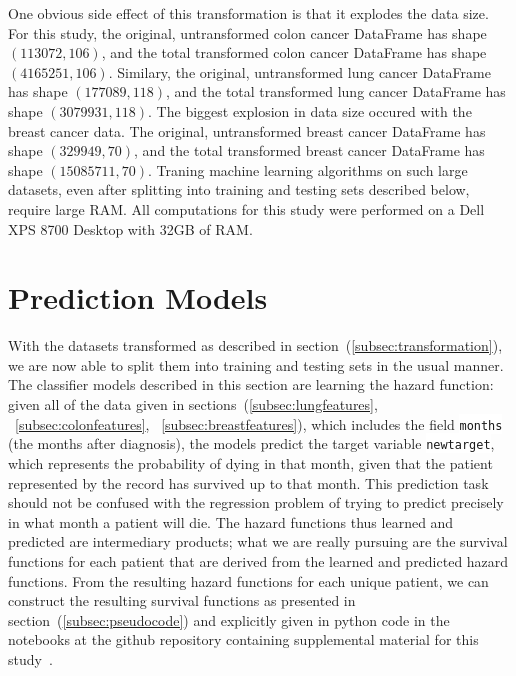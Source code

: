 \documentclass[a4paper,11pt]{article}
\newcommand{\codewhite}[1]{\colorbox{white}{\texttt{#1}}}
\begin{document}
One obvious side effect of this transformation is that it explodes the data size.
For this study, the original, untransformed colon cancer DataFrame has shape $(113072, 106)$, and the total transformed colon cancer DataFrame has shape $(4165251, 106)$.
Similary, the original, untransformed lung cancer DataFrame has shape $(177089, 118)$, and the total transformed lung cancer DataFrame has shape $(3079931, 118)$.
The biggest explosion in data size occured with the breast cancer data. 
The original, untransformed breast cancer DataFrame has shape $(329949, 70)$, and the total transformed breast cancer DataFrame has shape $(15085711, 70)$.
Traning machine learning algorithms on such large datasets, even after splitting into training and testing sets described below, require large RAM. All computations for this study were performed on a Dell XPS 8700 Desktop with 32GB of RAM.


\section{Prediction Models}
\label{sec:predmodels}

With the datasets transformed as described in section~(\ref{subsec:transformation}), we are now able to split them into training and testing sets in the usual manner.
The classifier models described in this section are learning the hazard function: given all of the data given in sections~(\ref{subsec:lungfeatures}, ~\ref{subsec:colonfeatures}, ~\ref{subsec:breastfeatures}), which includes the field \codewhite{months} (the months after diagnosis), the models predict the target variable \codewhite{newtarget}, which represents the probability of dying in that month, given that the patient represented by the record has survived up to that month. This prediction task should not be confused with the regression problem of trying to predict precisely in what month a patient will die.
The hazard functions thus learned and predicted are intermediary products; what we are really pursuing are the survival functions for each patient that are derived from the learned and predicted hazard functions.
From the resulting hazard functions for each unique patient, we can construct the
resulting survival functions as presented in section~(\ref{subsec:pseudocode}) and explicitly given in python code in the notebooks at the github repository containing supplemental material for this study~\cite{supp}.
\end{document}
